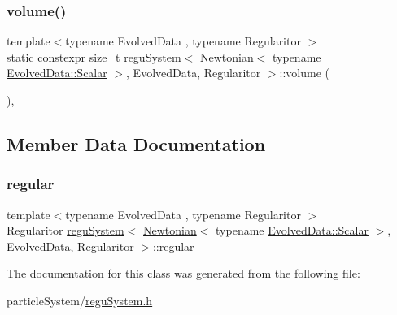 \subsubsection{\texorpdfstring{volume()}{volume()}}
{\footnotesize\ttfamily template$<$typename Evolved\+Data , typename Regularitor $>$ \\
static constexpr size\+\_\+t \mbox{\hyperlink{classregu_system}{regu\+System}}$<$ \mbox{\hyperlink{class_newtonian}{Newtonian}}$<$ typename \mbox{\hyperlink{classregu_system_aca8ee2c387943164ee3ea68370fc3ac0}{Evolved\+Data\+::\+Scalar}} $>$, Evolved\+Data, Regularitor $>$\+::volume (\begin{DoxyParamCaption}{ }\end{DoxyParamCaption})\hspace{0.3cm}{\ttfamily [inline]}, {\ttfamily [static]}}



\subsection{Member Data Documentation}
\mbox{\label{classregu_system_3_01_newtonian_3_01typename_01_evolved_data_1_1_scalar_01_4_00_01_evolved_data_00_01_regularitor_01_4_a56f2b9c617d94ca6e1d5ae5cc97fef0f}} 
\subsubsection{\texorpdfstring{regular}{regular}}
{\footnotesize\ttfamily template$<$typename Evolved\+Data , typename Regularitor $>$ \\
Regularitor \mbox{\hyperlink{classregu_system}{regu\+System}}$<$ \mbox{\hyperlink{class_newtonian}{Newtonian}}$<$ typename \mbox{\hyperlink{classregu_system_aca8ee2c387943164ee3ea68370fc3ac0}{Evolved\+Data\+::\+Scalar}} $>$, Evolved\+Data, Regularitor $>$\+::regular\hspace{0.3cm}{\ttfamily [private]}}



The documentation for this class was generated from the following file\+:\begin{DoxyCompactItemize}
\item 
particle\+System/\mbox{\hyperlink{regu_system_8h}{regu\+System.\+h}}\end{DoxyCompactItemize}
